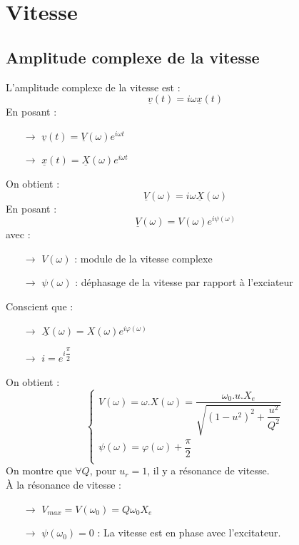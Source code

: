 \section{Vitesse}
\subsection{Amplitude complexe de la vitesse}
\begin{de}
L'amplitude complexe de la vitesse est : 
$$\underline{v}(t) = i\omega \underline{x}(t)$$
En posant : 
\begin{itemize}
 \item[$\rightarrow$] $ \underline{v}(t) = \underline{V}(\omega)e^{i\omega t}$
 \item[$\rightarrow$] $ \underline{x}(t) = \underline{X}(\omega)e^{i\omega t}$
\end{itemize}
On obtient : 
$$\underline{V}(\omega) = i\omega\underline{X}(\omega)$$
En posant : 
$$\underline{V}(\omega) = V(\omega)e^{i\psi(\omega)}$$
avec :
\begin{itemize}
 \item[$\rightarrow$] $V(\omega)$ : module de la vitesse complexe
 \item[$\rightarrow$] $\psi(\omega)$ : déphasage de la vitesse par rapport à l'exciateur
\end{itemize}
\end{de}
Conscient que : \\
\begin{itemize}
 \item[$\rightarrow$]  $\underline{X}(\omega) = X(\omega)e^{i\varphi(\omega)}$\\
 \item[$\rightarrow$] $i = e^{i\dfrac{\pi}{2}}$\\
\end{itemize}
On obtient : 
$$\begin{cases}
   V(\omega) = \omega.X(\omega) = \dfrac{\omega_0.u.X_e}{\sqrt{(1-u^2)^2 + \dfrac{u^2}{Q^2}}}\\
   \psi(\omega) = \varphi(\omega) + \dfrac{\pi}{2}\\
  \end{cases}$$
On montre que $\forall Q$, pour $u_r = 1$, il y a résonance de vitesse.\\
À la résonance de vitesse : 
\begin{itemize}
\item[$\rightarrow$] $V_{max} = V(\omega_0) = Q\omega_0X_e$
\item[$\rightarrow$] $\psi(\omega_0) = 0$ : La vitesse est en phase avec l'excitateur.
\end{itemize}
